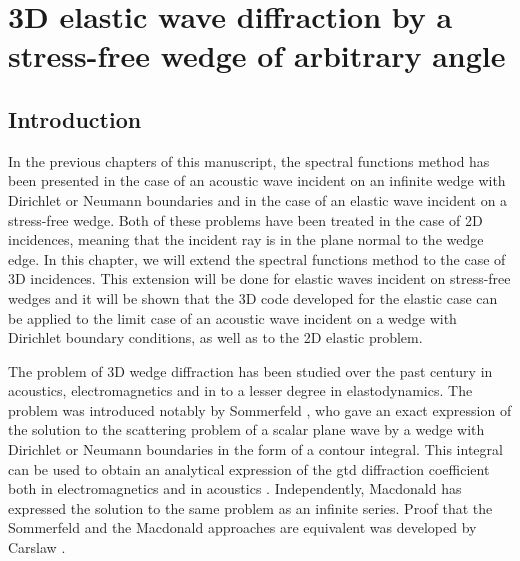 \chapter[][3D Elastic Case]{3D elastic wave diffraction by a stress-free wedge of arbitrary angle}
\label{chap-3D}

\section*{Introduction}

In the previous chapters of this manuscript, the spectral functions method has been presented in the case of an acoustic wave incident on an infinite wedge with Dirichlet or Neumann boundaries and in the case of an elastic wave incident on a stress-free wedge. Both of these problems have been treated in the case of 2D incidences, meaning that the incident ray is in the plane normal to the wedge edge. In this chapter, we will extend the spectral functions method to the case of 3D incidences. This extension will be done for elastic waves incident on stress-free wedges and it will be shown that the 3D code developed for the elastic case can be applied to the limit case of an acoustic wave incident on a wedge with Dirichlet boundary conditions, as well as to the 2D elastic problem.

The problem of 3D wedge diffraction has been studied over the past century in acoustics, electromagnetics and in to a lesser degree in elastodynamics. The problem was introduced notably by Sommerfeld \cite{Sommerfeld}, who gave an exact expression of the solution to the scattering problem of a scalar plane wave by a wedge with Dirichlet or Neumann boundaries in the form of a contour integral. This integral can be used to obtain an analytical expression of the \acrfull{gtd} diffraction coefficient both in electromagnetics and in acoustics \cite{Bouche,Bo}. Independently, Macdonald \cite{Macdo} has expressed the solution to the same problem as an infinite series. Proof that the Sommerfeld and the Macdonald approaches are equivalent was developed by Carslaw \cite{Carslaw}.


